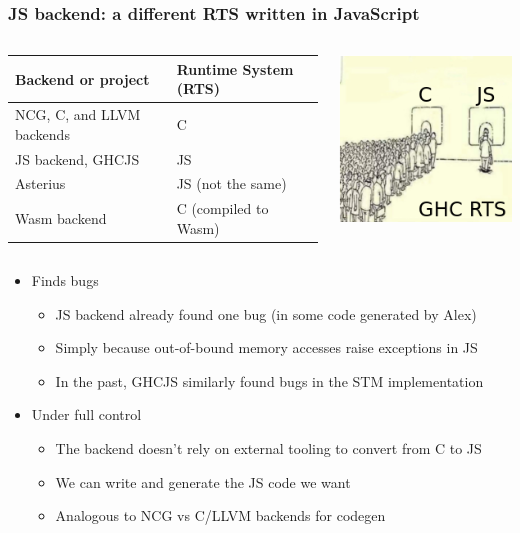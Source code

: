 \documentclass[aspectratio=169]{beamer}
\begin{document}
\begin{frame}
\frametitle{JS backend: a different RTS written in JavaScript}

\begin{columns}

\begin{column}{0.7\textwidth}
\resizebox{8cm}{!}
{
\begin{tabular}{ll}
\hline
\textbf{Backend or project} & \textbf{Runtime System (RTS)} \\ \hline
NCG, C, and LLVM backends & C \\
JS backend, GHCJS         & JS \\
Asterius                  & JS (not the same) \\
Wasm backend & C (compiled to Wasm) \\ \hline
\end{tabular}
}
\end{column}

\begin{column}{0.2\textwidth}
\includegraphics[scale=0.3]{images/queue_rts.png}
\end{column}
\end{columns}

\vspace{1cm}

\begin{itemize}
\item Finds bugs
\begin{itemize}
\item JS backend already found one bug (in some code generated by Alex)
\item Simply because out-of-bound memory accesses raise exceptions in JS
\item In the past, GHCJS similarly found bugs in the STM implementation
\end{itemize}
\item Under full control
\begin{itemize}
\item The backend doesn’t rely on external tooling to convert from C to JS
\item We can write and generate the JS code we want
\item Analogous to NCG vs C/LLVM backends for codegen
\end{itemize}
\end{itemize}
\end{frame}
\end{document}
